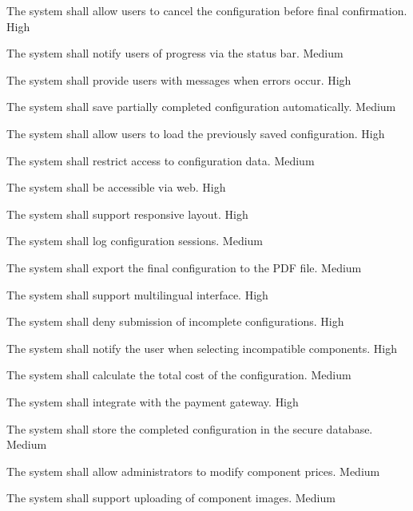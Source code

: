   {
    The system shall allow users to cancel the configuration before final confirmation.
  }
  {High}

  {
    The system shall notify users of progress via the status bar.
  }
  {Medium}

  {
    The system shall provide users with messages when errors occur.
  }
  {High}

  {
    The system shall save partially completed configuration automatically.
  }
  {Medium}

  {
    The system shall allow users to load the previously saved configuration.
  }
  {High}

  {
    The system shall restrict access to configuration data.
  }
  {Medium}

  {
    The system shall be accessible via web.
  }
  {High}

  {
    The system shall support responsive layout.
  }
  {High}

  {
    The system shall log configuration sessions.
  }
  {Medium}

  {
    The system shall export the final configuration to the PDF file.
  }
  {Medium}

  {
    The system shall support multilingual interface.
  }
  {High}

  {
    The system shall deny submission of incomplete configurations.
  }
  {High}

  {
    The system shall notify the user when selecting incompatible components.
  }
  {High}

  {
    The system shall calculate the total cost of the configuration.
  }
  {Medium}

  {
    The system shall integrate with the payment gateway.
  }
  {High}

  {
    The system shall store the completed configuration in the secure database.
  }
  {Medium}

  {
    The system shall allow administrators to modify component prices.
  }
  {Medium}

  {
    The system shall support uploading of component images.
  }
  {Medium}

